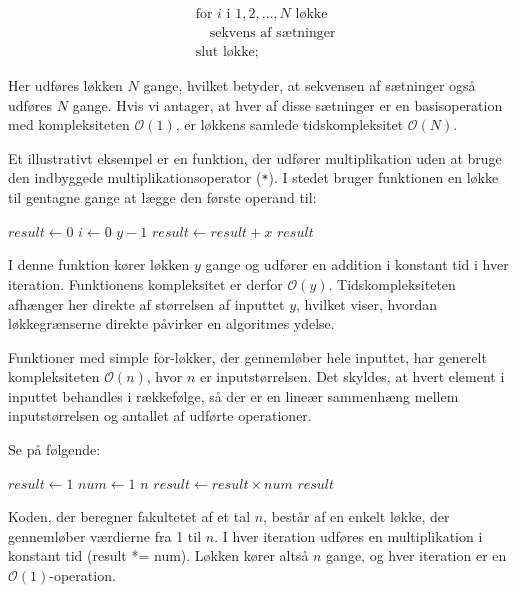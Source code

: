 \[
\begin{aligned}
& \text{for } i \text{ i } 1, 2, \ldots, N \text{ løkke} \\
& \quad \text{sekvens af sætninger} \\
& \text{slut løkke;}
\end{aligned}
\]

Her udføres løkken $N$ gange, hvilket betyder, at sekvensen af sætninger også udføres $N$ gange. Hvis vi antager, at hver af disse sætninger er en basisoperation med kompleksiteten $\mathcal{O}(1)$, er løkkens samlede tidskompleksitet $\mathcal{O}(N)$. 

Et illustrativt eksempel er en funktion, der udfører multiplikation uden at bruge den indbyggede multiplikationsoperator (\texttt{*}). I stedet bruger funktionen en løkke til gentagne gange at lægge den første operand til:

\begin{codebox}
    \li $result \gets 0$
    \li \For $i \gets 0$ \To $y - 1$ \Do
    \li     $result \gets result + x$
        \End
    \li \Return $result$
\end{codebox}

I denne funktion kører løkken $y$ gange og udfører en addition i konstant tid i hver iteration. Funktionens kompleksitet er derfor $\mathcal{O}(y)$. Tidskompleksiteten afhænger her direkte af størrelsen af inputtet $y$, hvilket viser, hvordan løkkegrænserne direkte påvirker en algoritmes ydelse.

Funktioner med simple for-løkker, der gennemløber hele inputtet, har generelt kompleksiteten $\mathcal{O}(n)$, hvor $n$ er inputstørrelsen. Det skyldes, at hvert element i inputtet behandles i rækkefølge, så der er en lineær sammenhæng mellem inputstørrelsen og antallet af udførte operationer.

Se på følgende:

\begin{codebox}
    \li $result \gets 1$
    \li \For $num \gets 1$ \To $n$ \Do
    \li     $result \gets result \times num$
        \End
    \li \Return $result$
\end{codebox}


Koden, der beregner fakultetet af et tal \( n \), består af en enkelt løkke, der gennemløber værdierne fra 1 til \( n \). I hver iteration udføres en multiplikation i konstant tid (result *= num). Løkken kører altså \( n \) gange, og hver iteration er en \(\mathcal{O}(1)\)-operation.

